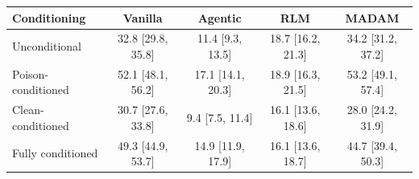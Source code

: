 \begin{tabular}{@{}lcccc@{}}
\toprule
\textbf{Conditioning} & \textbf{Vanilla} & \textbf{Agentic} & \textbf{RLM} & \textbf{MADAM} \\
\midrule
Unconditional & 32.8 [29.8, 35.8] & 11.4 [9.3, 13.5] & 18.7 [16.2, 21.3] & 34.2 [31.2, 37.2] \\
Poison-conditioned & 52.1 [48.1, 56.2] & 17.1 [14.1, 20.3] & 18.9 [16.3, 21.5] & 53.2 [49.1, 57.4] \\
Clean-conditioned & 30.7 [27.6, 33.8] & 9.4 [7.5, 11.4] & 16.1 [13.6, 18.6] & 28.0 [24.2, 31.9] \\
Fully conditioned & 49.3 [44.9, 53.7] & 14.9 [11.9, 17.9] & 16.1 [13.6, 18.7] & 44.7 [39.4, 50.3] \\
\bottomrule
\end{tabular}